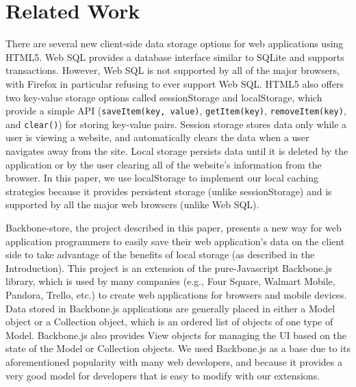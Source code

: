 \documentclass[12pt]{article}
\begin{document}
\section{Related Work}

There are several new client-side data storage options for web applications
using HTML5. Web SQL provides a database interface similar to SQLite and supports
transactions. However, Web SQL is not supported by all of the major browsers,
with Firefox in particular refusing to ever support Web SQL. HTML5 also offers two key-value storage options called sessionStorage and localStorage, which provide a simple API (\verb=saveItem(key, value)=, \verb=getItem(key)=,
\verb=removeItem(key)=, and \verb=clear()=) for storing key-value pairs. 
Session storage stores data only while a user is viewing a website, and
automatically clears the data when a user navigates away from the site. Local
storage persists data until it is deleted by the application or by the user
clearing all of the website's information from the browser. In this paper, we use localStorage to implement our local caching strategies because it provides persistent storage (unlike sessionStorage) and is supported by all the major web browsers (unlike Web SQL). 

Backbone-store, the project described in this paper, presents a new way for web
application programmers to easily save their web application's data on the
client side to take advantage of the benefits of local storage (as described in the Introduction). This project is an extension of the pure-Javascript Backbone.js \cite{backbone} library, which is used by many companies (e.g., Four Square, Walmart Mobile, Pandora, Trello, etc.) to create web applications for browsers and mobile devices. Data
stored in Backbone.js applications are generally placed in either a Model
object or a Collection object, which is an ordered list of objects of one type
of Model. Backbone.js also provides View objects for managing the UI based on
the state of the Model or Collection objects. We used Backbone.js as a base due
to its aforementioned popularity with many web developers, and because it
provides a very good model for developers that is easy to modify with our extensions.
\end{document}
